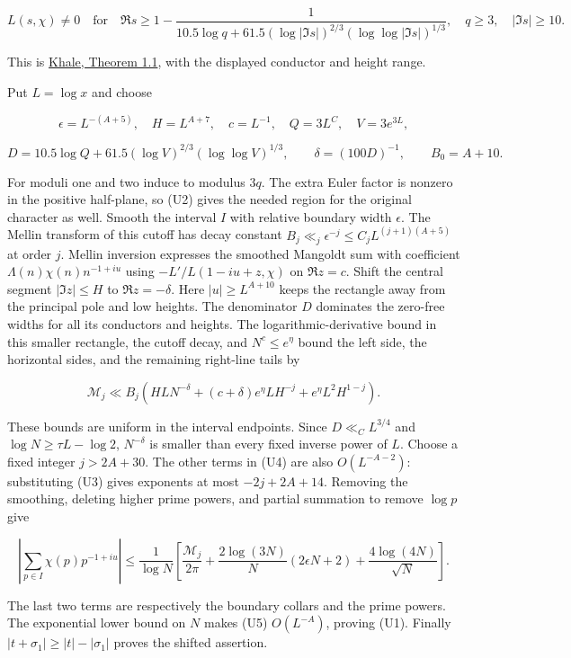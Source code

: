 \[
L(s,\chi)\ne0\quad\text{for}\quad
\Re s\ge1-
 \frac1{10.5\log q+61.5(\log|\Im s|)^{2/3}
                              (\log\log|\Im s|)^{1/3}},
\quad q\ge3,\quad |\Im s|\ge10.
\tag{U2}
\]

This is \href{https://arxiv.org/pdf/2210.06457\#page=1}{Khale, Theorem
1.1}, with the displayed conductor and height range.

Put \(L=\log x\) and choose

\[
\epsilon=L^{-(A+5)},\quad H=L^{A+7},\quad c=L^{-1},\quad
Q=3L^C,\quad V=3e^{3L},
\]

\[
D=10.5\log Q+61.5(\log V)^{2/3}(\log\log V)^{1/3},
\qquad \delta=(100D)^{-1},\qquad B_0=A+10.
\tag{U3}
\]

For moduli one and two induce to modulus \(3q\). The extra Euler factor
is nonzero in the positive half-plane, so (U2) gives the needed region
for the original character as well. Smooth the interval \(I\) with
relative boundary width \(\epsilon\). The Mellin transform of this
cutoff has decay constant \(B_j\ll_j\epsilon^{-j}\le C_jL^{(j+1)(A+5)}\)
at order \(j\). Mellin inversion expresses the smoothed Mangoldt sum
with coefficient \(\Lambda(n)\chi(n)n^{-1+iu}\) using
\(-L'/L(1-iu+z,\chi)\) on \(\Re z=c\). Shift the central segment
\(|\Im z|\le H\) to \(\Re z=-\delta\). Here \(|u|\ge L^{A+10}\) keeps
the rectangle away from the principal pole and low heights. The
denominator \(D\) dominates the zero-free widths for all its conductors
and heights. The logarithmic-derivative bound in this smaller rectangle,
the cutoff decay, and \(N^c\le e^\eta\) bound the left side, the
horizontal sides, and the remaining right-line tails by

\[
\mathcal M_j\ll B_j\left(
 HLN^{-\delta}
 +(c+\delta)e^\eta LH^{-j}
 +e^\eta L^2H^{1-j}\right).
\tag{U4}
\]

These bounds are uniform in the interval endpoints. Since
\(D\ll_C L^{3/4}\) and \(\log N\ge\tau L-\log2\), \(N^{-\delta}\) is
smaller than every fixed inverse power of \(L\). Choose a fixed integer
\(j>2A+30\). The other terms in (U4) are also \(O(L^{-A-2})\):
substituting (U3) gives exponents at most \(-2j+2A+14\). Removing the
smoothing, deleting higher prime powers, and partial summation to remove
\(\log p\) give

\[
\left|\sum_{p\in I}\chi(p)p^{-1+iu}\right|
\le\frac1{\log N}\left[
 \frac{\mathcal M_j}{2\pi}
 +\frac{2\log(3N)}N(2\epsilon N+2)
 +\frac{4\log(4N)}{\sqrt N}\right].
\tag{U5}
\]

The last two terms are respectively the boundary collars and the prime
powers. The exponential lower bound on \(N\) makes (U5) \(O(L^{-A})\),
proving (U1). Finally \(|t+\sigma_1|\ge|t|-|\sigma_1|\) proves the
shifted assertion.

